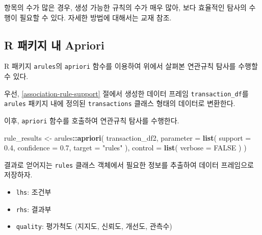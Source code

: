 \documentclass[]{book}
\newenvironment{Shaded}{\begin{snugshade}}{\end{snugshade}}
\newcommand{\DataTypeTok}[1]{\textcolor[rgb]{0.13,0.29,0.53}{#1}}
\newcommand{\FloatTok}[1]{\textcolor[rgb]{0.00,0.00,0.81}{#1}}
\newcommand{\KeywordTok}[1]{\textcolor[rgb]{0.13,0.29,0.53}{\textbf{#1}}}
\newcommand{\NormalTok}[1]{#1}
\newcommand{\OperatorTok}[1]{\textcolor[rgb]{0.81,0.36,0.00}{\textbf{#1}}}
\newcommand{\OtherTok}[1]{\textcolor[rgb]{0.56,0.35,0.01}{#1}}
\newcommand{\StringTok}[1]{\textcolor[rgb]{0.31,0.60,0.02}{#1}}
\providecommand{\tightlist}{%
  \setlength{\itemsep}{0pt}\setlength{\parskip}{0pt}}
\begin{document}
항목의 수가 많은 경우, 생성 가능한 규칙의 수가 매우 많아, 보다 효율적인 탐사의 수행이 필요할 수 있다. 자세한 방법에 대해서는 교재 \citep{jun2012datamining} 참조.

\hypertarget{apriori-r-package}{%
\subsection{R 패키지 내 Apriori}\label{apriori-r-package}}

R 패키지 \texttt{arules}의 \texttt{apriori} 함수를 이용하여 위에서 살펴본 연관규칙 탐사를 수행할 수 있다.

우선, \ref{association-rule-support} 절에서 생성한 데이터 프레임 \texttt{transaction\_df}를 \texttt{arules} 패키지 내에 정의된 \texttt{transactions} 클래스 형태의 데이터로 변환한다.

\begin{Shaded}
\end{Shaded}

이후, \texttt{apriori} 함수를 호출하여 연관규칙 탐사를 수행한다.

\begin{Shaded}
\begin{Highlighting}[]
\NormalTok{rule_results <-}\StringTok{ }\NormalTok{arules}\OperatorTok{::}\KeywordTok{apriori}\NormalTok{(}
\NormalTok{  transaction_df2,}
  \DataTypeTok{parameter =} \KeywordTok{list}\NormalTok{(}
    \DataTypeTok{support =} \FloatTok{0.4}\NormalTok{,}
    \DataTypeTok{confidence =} \FloatTok{0.7}\NormalTok{,}
    \DataTypeTok{target =} \StringTok{"rules"}
\NormalTok{  ),}
  \DataTypeTok{control =} \KeywordTok{list}\NormalTok{(}
    \DataTypeTok{verbose =} \OtherTok{FALSE}
\NormalTok{  )}
\NormalTok{)}
\end{Highlighting}
\end{Shaded}

결과로 얻어지는 \texttt{rules} 클래스 객체에서 필요한 정보를 추출하여 데이터 프레임으로 저장하자.

\begin{itemize}
\tightlist
\item
  \texttt{lhs}: 조건부
\item
  \texttt{rhs}: 결과부
\item
  \texttt{quality}: 평가척도 (지지도, 신뢰도, 개선도, 관측수)
\end{itemize}
\end{document}
